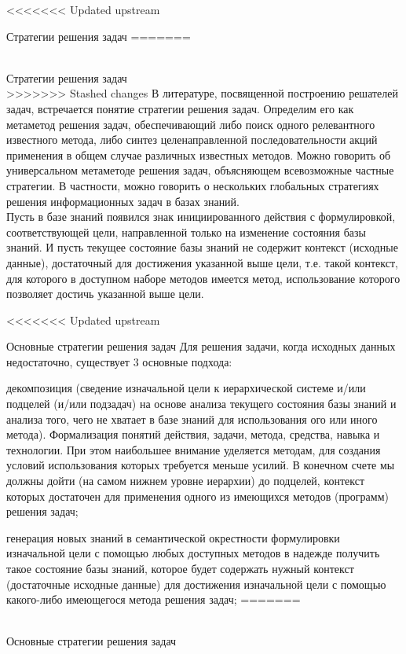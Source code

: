 <<<<<<< Updated upstream
\begin{frame}{Стратегии решения задач}
\vspace{20}
=======
\begin{frame}{\\Стратегии решения задач}
\topline
\vspace{30}
 \\
 
>>>>>>> Stashed changes
    В литературе, посвященной построению решателей задач, встречается понятие стратегии решения задач. Определим его как метаметод решения задач, обеспечивающий либо поиск одного релевантного известного метода, либо синтез целенаправленной последовательности акций применения в общем случае различных известных методов. Можно говорить об универсальном метаметоде решения задач, объясняющем всевозможные частные стратегии. В частности, можно говорить о нескольких глобальных стратегиях решения информационных задач в базах знаний.\\
    Пусть в базе знаний появился знак инициированного действия с формулировкой, соответствующей цели, направленной только на изменение состояния базы знаний. И пусть текущее состояние базы знаний не содержит контекст (исходные данные), достаточный для достижения указанной выше цели, т.е. такой контекст, для которого в доступном наборе методов имеется метод, использование которого позволяет достичь указанной выше цели.
\end{frame}

<<<<<<< Updated upstream
\begin{frame}{\large Основные стратегии решения задач}
\vspace{20}
        Для решения задачи, когда исходных данных недостаточно, существует 3 основные подхода:
        \begin{textitemize}
            \item декомпозиция (сведение изначальной цели к иерархической системе и/или подцелей (и/или подзадач) на основе анализа текущего состояния базы знаний и анализа того, чего не хватает в базе знаний для использования ого или иного метода). Формализация понятий действия, задачи, метода, средства, навыка и технологии. При этом наибольшее внимание уделяется методам, для создания условий использования которых требуется меньше усилий. В конечном счете мы должны дойти (на самом нижнем уровне иерархии) до подцелей, контекст которых достаточен для применения одного из имеющихся методов (программ) решения задач;
            \item генерация новых знаний в семантической окрестности формулировки изначальной цели с помощью любых доступных методов в надежде получить такое состояние базы знаний, которое будет содержать нужный контекст (достаточные исходные данные) для достижения изначальной цели с помощью какого-либо имеющегося метода решения задач;
=======
\begin{frame}{\\Основные стратегии решения задач}
\topline
\vspace{40}
 \\
 

\end{frame}
\end{textitemize}
\end{frame}
\end{frame}
